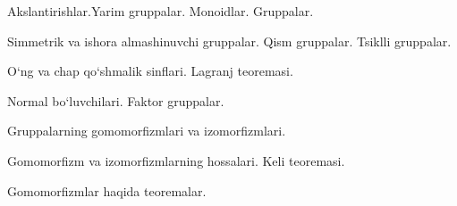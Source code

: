 Akslantirishlar.Yarim gruppalar. Monoidlar. Gruppalar.

Simmetrik va ishora almashinuvchi gruppalar. Qism gruppalar. Tsiklli gruppalar.

O`ng va chap qo`shmalik sinflari. Lagranj teoremasi.

Normal bo`luvchilari. Faktor gruppalar.

Gruppalarning gomomorfizmlari va izomorfizmlari.

Gomomorfizm va izomorfizmlarning hossalari. Keli teoremasi.

Gomomorfizmlar haqida teoremalar.